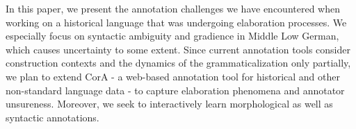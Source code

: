 In this paper, we present the annotation challenges we have encountered when working on a historical language that was undergoing elaboration processes. We especially focus on syntactic ambiguity and gradience in Middle Low German, which causes uncertainty to some extent. Since current annotation tools consider construction contexts and the dynamics of the grammaticalization only partially, we plan to extend CorA - a web-based annotation tool for historical and other non-standard language data - to capture elaboration phenomena and annotator unsureness. Moreover, we seek to interactively learn morphological as well as syntactic annotations.
